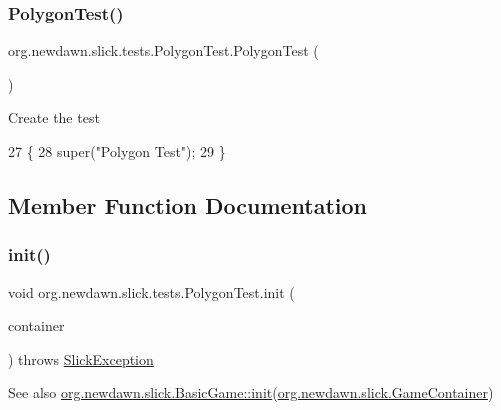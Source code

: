 \subsubsection{\texorpdfstring{Polygon\+Test()}{PolygonTest()}}
{\footnotesize\ttfamily org.\+newdawn.\+slick.\+tests.\+Polygon\+Test.\+Polygon\+Test (\begin{DoxyParamCaption}{ }\end{DoxyParamCaption})\hspace{0.3cm}{\ttfamily [inline]}}

Create the test 
\begin{DoxyCode}
27                          \{
28         super(\textcolor{stringliteral}{"Polygon Test"});
29     \}
\end{DoxyCode}


\subsection{Member Function Documentation}
\mbox{\label{classorg_1_1newdawn_1_1slick_1_1tests_1_1_polygon_test_a61bd34b76fb509d02e93e4b6ccdc8d2e}} 
\subsubsection{\texorpdfstring{init()}{init()}}
{\footnotesize\ttfamily void org.\+newdawn.\+slick.\+tests.\+Polygon\+Test.\+init (\begin{DoxyParamCaption}\item[{\mbox{\hyperlink{classorg_1_1newdawn_1_1slick_1_1_game_container}{Game\+Container}}}]{container }\end{DoxyParamCaption}) throws \mbox{\hyperlink{classorg_1_1newdawn_1_1slick_1_1_slick_exception}{Slick\+Exception}}\hspace{0.3cm}{\ttfamily [inline]}}

\begin{DoxySeeAlso}{See also}
\mbox{\hyperlink{classorg_1_1newdawn_1_1slick_1_1_basic_game_a8af0900217e4d389249f71367b22d114}{org.\+newdawn.\+slick.\+Basic\+Game\+::init}}(\mbox{\hyperlink{classorg_1_1newdawn_1_1slick_1_1_game_container}{org.\+newdawn.\+slick.\+Game\+Container}}) 
\end{DoxySeeAlso}


